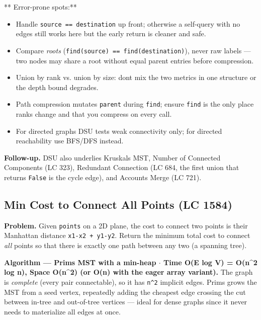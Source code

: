 \documentclass[11pt]{article}
\providecommand{\tightlist}{\setlength{\itemsep}{1pt}\setlength{\parskip}{0pt}}
\begin{document}
** Error-prone spots:**

\begin{itemize}
\tightlist
\item
  Handle \texttt{source\ ==\ destination} up front; otherwise a self-query with no edges still works here but the early return is cleaner and safe.
\item
  Compare \emph{roots} (\texttt{find(source)\ ==\ find(destination)}), never raw labels --- two nodes may share a root without equal parent entries before compression.
\item
  Union by rank vs. union by size: don\textquotesingle t mix the two metrics in one structure or the depth bound degrades.
\item
  Path compression mutates \texttt{parent} during \texttt{find}; ensure \texttt{find} is the only place ranks change and that you compress on every call.
\item
  For directed graphs DSU tests weak connectivity only; for directed reachability use BFS/DFS instead.
\end{itemize}

\textbf{Follow-up.} DSU also underlies Kruskal\textquotesingle s MST, Number of Connected Components (LC 323), Redundant Connection (LC 684, the first union that returns \texttt{False} is the cycle edge), and Accounts Merge (LC 721).

\subsection{Min Cost to Connect All Points (LC 1584)}\label{min-cost-to-connect-all-points-lc-1584}

\textbf{Problem.} Given \texttt{points} on a 2D plane, the cost to connect two points is their Manhattan distance \texttt{\textbar{}x1-x2\textbar{}\ +\ \textbar{}y1-y2\textbar{}}. Return the minimum total cost to connect \emph{all} points so that there is exactly one path between any two (a spanning tree).

\textbf{Algorithm --- Prim\textquotesingle s MST with a min-heap \(\cdot\) Time O(E log V) = O(n\^{}2 log n), Space O(n\^{}2) (or O(n) with the eager array variant).} The graph is \emph{complete} (every pair connectable), so it has \texttt{n\^{}2} implicit edges. Prim\textquotesingle s grows the MST from a seed vertex, repeatedly adding the cheapest edge crossing the cut between in-tree and out-of-tree vertices --- ideal for dense graphs since it never needs to materialize all edges at once.
\end{document}
